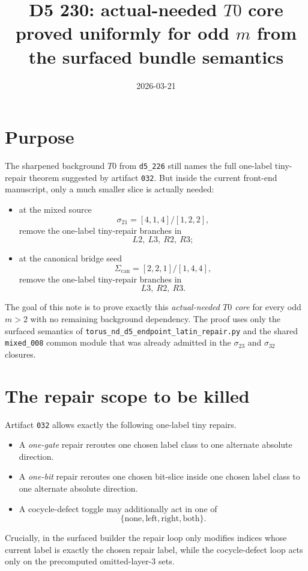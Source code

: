 \documentclass[11pt]{article}
\title{D5 230: actual-needed $T0$ core proved uniformly for odd $m$ from the surfaced bundle semantics}
\author{}
\date{2026-03-21}
\begin{document}
\maketitle

\section*{Purpose}
The sharpened background $T0$ from \texttt{d5\_226} still names the full
one-label tiny-repair theorem suggested by artifact \texttt{032}.  But inside the
current front-end manuscript, only a much smaller slice is actually needed:
\begin{itemize}
\item at the mixed source
\[
\sigma_{21}=[4,1,4]/[1,2,2],
\]
remove the one-label tiny-repair branches in
\[
L2,\ L3,\ R2,\ R3;
\]
\item at the canonical bridge seed
\[
\Sigma_{\mathrm{can}}=[2,2,1]/[1,4,4],
\]
remove the one-label tiny-repair branches in
\[
L3,\ R2,\ R3.
\]
\end{itemize}

The goal of this note is to prove exactly this \emph{actual-needed $T0$ core}
for every odd $m>2$ with no remaining background dependency.
The proof uses only the surfaced semantics of
\texttt{torus\_nd\_d5\_endpoint\_latin\_repair.py} and the shared
\texttt{mixed\_008} common module that was already admitted in the
$\sigma_{23}$ and $\sigma_{32}$ closures.

\section*{The repair scope to be killed}
Artifact \texttt{032} allows exactly the following one-label tiny repairs.
\begin{itemize}
\item A \emph{one-gate} repair reroutes one chosen label class to one alternate
absolute direction.
\item A \emph{one-bit} repair reroutes one chosen bit-slice inside one chosen label
class to one alternate absolute direction.
\item A cocycle-defect toggle may additionally act in one of
\[
\{\mathrm{none},\mathrm{left},\mathrm{right},\mathrm{both}\}.
\]
\end{itemize}

Crucially, in the surfaced builder the repair loop only modifies indices whose
current label is exactly the chosen repair label, while the cocycle-defect loop
acts only on the precomputed omitted-layer-$3$ sets.
\end{document}
